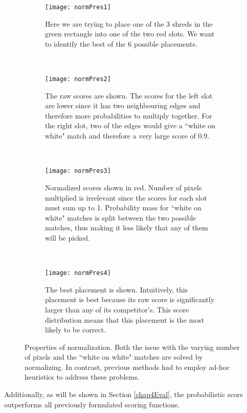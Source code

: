 \begin{figure}[H]
        \centering
        \begin{subfigure}[b]{0.49\textwidth}
                \centering
                \texttt{[image: normPres1]}
                \caption{Here we are trying to place one of the 3 shreds in the green rectangle into one of the two red slots. We want to identify the best of the 6 possible placements.\vspace{2\baselineskip}}
        \end{subfigure}
        ~ 
        \begin{subfigure}[b]{0.49\textwidth}
                \centering
                \texttt{[image: normPres2]}
                \caption{The raw scores are shown. The scores for the left slot are lower since it has two neighbouring edges and therefore more probabilities to multiply together. For the right slot, two of the edges would give a ``white on white" match and therefore a very large score of 0.9.}
        \end{subfigure}
        ~ 
        \begin{subfigure}[b]{0.49\textwidth}
                \centering
                \texttt{[image: normPres3]}
                \caption{Normalized scores shown in red. Number of pixels multiplied is irrelevant since the scores for each slot must sum up to 1. Probability mass for ``white on white" matches is split between the two possible matches, thus making it less likely that any of them will be picked.}
        \end{subfigure}
        ~ 
        \begin{subfigure}[b]{0.49\textwidth}
                \centering
                \texttt{[image: normPres4]}
                \caption{The best placement is shown. Intuitively, this placement is best because its raw score is significantly larger than any of its competitor's. This score distribution means that this placement is the most likely to be correct.\vspace{1\baselineskip}}
        \end{subfigure}
        \caption{Properties of normalization. Both the issue with the varying number of pixels and the ``white on white" matches are solved by normalizing. In contrast, previous methods \cite{P1,P2} had to employ ad-hoc heuristics to address these problems.}
        \label{fig:norm}
\end{figure}
Additionally, as will be shown in Section \ref{chap4Eval}, the probabilistic score outperforms all previously formulated scoring functions.

